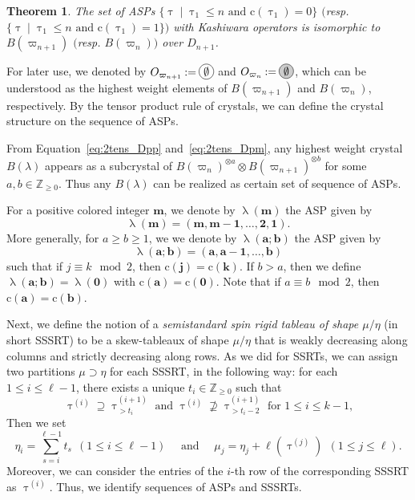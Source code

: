 \documentclass[11pt, leqno]{amsart}
\theoremstyle{plain}
\newtheorem{theorem}{Theorem}[section]
\theoremstyle{definition}
\numberwithin{equation}{section}
\newcommand{\fw}{\varpi} %
\newcommand{\seteq}{\mathbin{:=}}
\newcommand{\cn}[1]{\mathbf{#1}}
\newcommand{\clr}{\mathrm{c}}
\newcommand{\btau}{\uptau}
\newcommand*\gn[1]{\tikz[baseline=(char.base)]{%
            \node[shape=circle,fill=gray!40,draw,inner sep=1.3pt] (char) {#1};}}
\newcommand*\nn[1]{\tikz[baseline=(char.base)]{%
            \node[shape=circle,draw,inner sep=1.3pt] (char) {#1};}}
\newcommand{\Z}{\mathbb{Z}}
\newcommand{\defn}[1]{{\color{darkred}\emph{#1}}} %
\begin{document}
\begin{theorem}
The set of ASPs $\{ \btau \mid \btau_1 \le n \text{ and } \clr(\btau_1)=0 \}$ $($resp. $\{ \btau \mid \btau_1 \le n \text{ and } \clr(\btau_1)=1 \})$ with Kashiwara operators is isomorphic to
$B(\fw_{n+1})$ $($resp. $B(\fw_{n}))$ over $D_{n+1}$.
\end{theorem}

For later use, we denoted by $O_{\fw_{n+1}} \seteq \nn{$\emptyset$}$ and $O_{\fw_n} \seteq \gn{$\emptyset$}$, which can be understood as the highest weight elements of $B(\fw_{n+1})$ and $B(\fw_{n})$, respectively.
By the tensor product rule of crystals, we can define the crystal structure on the sequence of ASPs.

From Equation~\eqref{eq:2tens_Dpp} and~\eqref{eq:2tens_Dpm}, any highest weight crystal $B(\lambda)$ appears as a subcrystal of $B(\fw_{n})^{\otimes a} \otimes B(\fw_{n+1})^{\otimes b}$ for some $a,b \in \Z_{\ge 0}$. Thus any
$B(\lambda)$ can be realized as certain set of sequence of ASPs.

For a positive colored integer $\cn{m}$, we denote by $\uplambda(\cn{m})$ the ASP given by
\[
\uplambda (\cn{m})=(\cn{m},\cn{m}-\cn{1},\ldots,\cn{2},\cn{1}).
\]
More generally, for $ a \ge b \ge 1$, we
 we denote by $\uplambda(\cn{a};\cn{b})$ the ASP given by
\[
\uplambda(\cn{a};\cn{b})=(\cn{a},\cn{a}-\cn{1},\ldots,\cn{b})
\]
such that if $j \equiv k \mod{2}$, then $\clr(\cn{j}) = \clr(\cn{k})$.
If $b>a$, then we define $\uplambda(\cn{a};\cn{b}) = \uplambda(\cn{0})$ with $\clr(\cn{a}) = \clr(\cn{0})$.
Note that if $a\equiv b \mod{2}$, then $\clr(\cn{a}) = \clr(\cn{b})$.



 Next, we define the notion of a \defn{semistandard spin rigid tableau of shape $\mu / \eta$} (in short SSSRT) to be a skew-tableaux of shape $\mu / \eta$ that is weakly decreasing along columns and strictly decreasing along rows. As we did for SSRTs, we can assign two partitions $\mu \supset \eta$ for each SSSRT, in the following way:
for each $1 \le i \le \ell-1$, there exists a unique $t_i \in \Z_{\ge 0}$ such that
\[
\text{$\btau^{(i)} \supseteq \btau^{(i+1)}_{>t_i}$ and $\btau^{(i)} \not \supseteq \btau^{(i+1)}_{> t_i-2}$ for $1 \le i \le k-1$,}
\]
Then we set
\[
\eta_i = \displaystyle\sum_{s=i}^{\ell-1} t_s \ \ (1 \le i \le \ell-1) \quad \text{ and } \quad \mu_j = \eta_j +\ell(\btau^{(j)})\ \ (1 \le j \le \ell).
\]
Moreover, we can consider the entries of the $i$-th row of the corresponding SSSRT as $\btau^{(i)}$.
Thus, we identify sequences of ASPs and SSSRTs.
\end{document}
